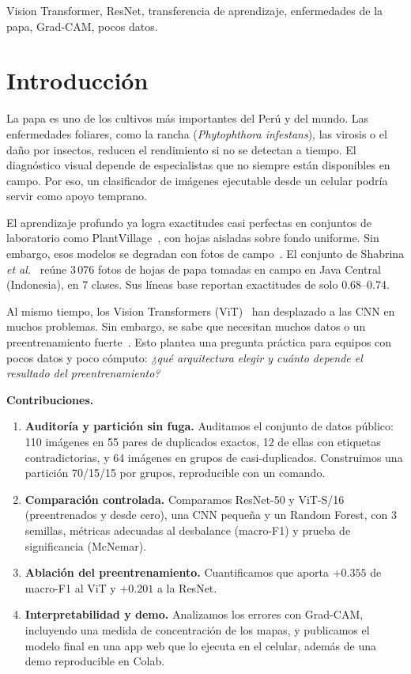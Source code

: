 \documentclass[conference,a4paper]{IEEEtran}
\begin{document}
\begin{IEEEkeywords}
Vision Transformer, ResNet, transferencia de aprendizaje, enfermedades de la papa, Grad-CAM, pocos datos.
\end{IEEEkeywords}

\section{Introducción}
La papa es uno de los cultivos más importantes del Perú y del mundo. Las enfermedades foliares, como la rancha (\textit{Phytophthora infestans}), las virosis o el daño por insectos, reducen el rendimiento si no se detectan a tiempo. El diagnóstico visual depende de especialistas que no siempre están disponibles en campo. Por eso, un clasificador de imágenes ejecutable desde un celular podría servir como apoyo temprano.

El aprendizaje profundo ya logra exactitudes casi perfectas en conjuntos de laboratorio como PlantVillage~\cite{mohanty2016plant,ferentinos2018plant}, con hojas aisladas sobre fondo uniforme. Sin embargo, esos modelos se degradan con fotos de campo~\cite{mohanty2016plant}. El conjunto de Shabrina \textit{et al.}~\cite{shabrina2024potato} reúne 3\,076 fotos de hojas de papa tomadas en campo en Java Central (Indonesia), en 7 clases. Sus líneas base reportan exactitudes de solo 0.68--0.74.

Al mismo tiempo, los Vision Transformers (ViT)~\cite{dosovitskiy2021vit} han desplazado a las CNN en muchos problemas. Sin embargo, se sabe que necesitan muchos datos o un preentrenamiento fuerte~\cite{dosovitskiy2021vit,touvron2021deit,steiner2022howtotrain}. Esto plantea una pregunta práctica para equipos con pocos datos y poco cómputo: \emph{¿qué arquitectura elegir y cuánto depende el resultado del preentrenamiento?}

\textbf{Contribuciones.}
\begin{enumerate}
\item \textbf{Auditoría y partición sin fuga.} Auditamos el conjunto de datos público: 110 imágenes en 55 pares de duplicados exactos, 12 de ellas con etiquetas contradictorias, y 64 imágenes en grupos de casi-duplicados. Construimos una partición 70/15/15 por grupos, reproducible con un comando.
\item \textbf{Comparación controlada.} Comparamos ResNet-50 y ViT-S/16 (preentrenados y desde cero), una CNN pequeña y un Random Forest, con 3 semillas, métricas adecuadas al desbalance (macro-F1) y prueba de significancia (McNemar).
\item \textbf{Ablación del preentrenamiento.} Cuantificamos que aporta $+0.355$ de macro-F1 al ViT y $+0.201$ a la ResNet.
\item \textbf{Interpretabilidad y demo.} Analizamos los errores con Grad-CAM, incluyendo una medida de concentración de los mapas, y publicamos el modelo final en una app web que lo ejecuta en el celular, además de una demo reproducible en Colab.
\end{enumerate}
\end{document}
